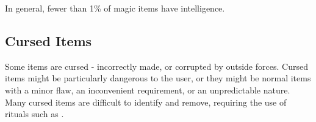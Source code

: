 In general, fewer than 1\% of magic items have intelligence.

\subsection{Cursed Items}

Some items are cursed - incorrectly made, or corrupted by outside forces. Cursed items might be particularly dangerous to the user, or they might be normal items with a minor flaw, an inconvenient requirement, or an unpredictable nature. Many cursed items are difficult to identify and remove, requiring the use of rituals such as .
